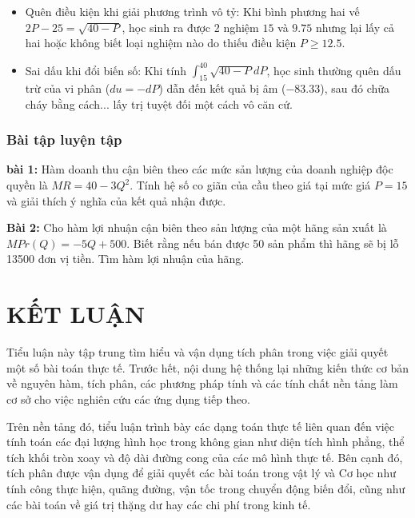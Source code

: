 \documentclass[12pt,a4paper,oneside]{book}
\theoremstyle{theorem}
\theoremstyle{definition}
\begin{document}
\begin{itemize}
\begin{itemize}
\begin{itemize}
            \item  Khi tính $PS$, học sinh thường lấy cận từ $0$ đến $15$ mà quên mất rằng tại $P < 12.5$ thì lượng cung đã bị âm (vô lý trong kinh tế).
        \end{itemize}
        \item Quên điều kiện khi giải phương trình vô tỷ: Khi bình phương hai vế $2P - 25 = \sqrt{40-P}$, học sinh ra được 2 nghiệm $15$  và  $9.75$  nhưng lại lấy cả hai hoặc không biết loại nghiệm nào do thiếu điều kiện $P \ge 12.5$.
        \item Sai dấu khi đổi biến số: Khi tính $\int_{15}^{40} \sqrt{40-P} dP$, học sinh thường quên dấu trừ của vi phân ($du = -dP$) dẫn đến kết quả bị âm ($-83.33$), sau đó chữa cháy bằng cách... lấy trị tuyệt đối một cách vô căn cứ.
    \end{itemize}
\end{itemize}
\subsection{Bài tập luyện tập}
\noindent\textbf{bài 1:} Hàm doanh thu cận biên theo các mức sản lượng của doanh nghiệp độc quyền là $MR = 40 - 3Q^2$. Tính hệ số co giãn của cầu theo giá tại mức giá $P = 15$ và giải thích ý nghĩa của kết quả nhận được.

\noindent\textbf{Bài 2:} Cho hàm lợi nhuận cận biên theo sản lượng của một hãng sản xuất là $MPr(Q) = -5Q + 500$. Biết rằng nếu bán được 50 sản phẩm thì hãng sẽ bị lỗ 13500 đơn vị tiền. Tìm hàm lợi nhuận của hãng.

 \chapter*{KẾT LUẬN}
 Tiểu luận này tập trung tìm hiểu và vận dụng tích phân trong việc giải quyết một số bài toán thực tế. Trước hết, nội dung hệ thống lại những kiến thức cơ bản về nguyên hàm, tích phân, các phương pháp tính và các tính chất nền tảng làm cơ sở cho việc nghiên cứu các ứng dụng tiếp theo.

Trên nền tảng đó, tiểu luận trình bày các dạng toán thực tế liên quan đến việc tính toán các đại lượng hình học trong không gian như diện tích hình phẳng, thể tích khối tròn xoay và độ dài đường cong của các mô hình thực tế. Bên cạnh đó, tích phân được vận dụng để giải quyết các bài toán trong vật lý và Cơ học như tính công thực hiện, quãng đường, vận tốc trong chuyển động biến đổi, cũng như các bài toán về giá trị thặng dư hay các chi phí trong kinh tế.
\end{document}
